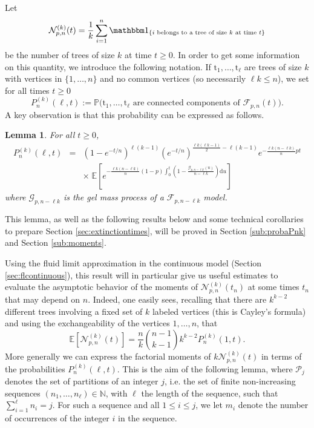 \documentclass[a4, 11pt]{article}
\numberwithin{equation}{section}
\theoremstyle{plain}
\newtheorem{lemma}[theorem]{Lemma}
\theoremstyle{definition}
\theoremstyle{remark}
\begin{document}
Let 
$$\mathcal N_{p,n}^{(k)}(t)=\frac{1}{k}\sum_{i=1}^n \mathbbm 1_{\{i  \text{ belongs to a tree of size }k \text{ at time }t\}}$$ be the number of trees of size $k$ at time $t \geq 0$. In order to get some information on this quantity, 
we introduce the following notation. If $\mathrm t_1,\ldots,\mathrm t_\ell$ are trees of size $k$ with vertices in $\{1,\ldots,n\}$ and no common vertices (so necessarily $\ell k \leq n$), we set for all times $t\geq 0$
$$
P_n^{(k)}(\ell,t):=\mathbb P \big(\mathrm t_1,\ldots,\mathrm t_{\ell} \text{ are connected components of } \mathcal{F}_{p,n}(t)\big).
$$
A key observation is that this probability can be expressed as follows.

\begin{lemma}
\label{lem:cvPnk}
For all $t\geq 0$,
\begin{eqnarray*}
P_n^{(k)}(\ell,t) &=& \left(1-e^{-t/n}\right)^{\ell (k-1)} \left(e^{-t/n} \right)^{\frac{\ell k(\ell k-1)}{2}-\ell(k-1)}e^{-\frac{\ell k(n-\ell k)}{n}pt} \\
&& \times \; \mathbb E\left[e^{-\frac{\ell k(n-\ell k)}{n} (1-p)\int_0^t \left(1-\frac{\mathcal G_{p,n-\ell k}(u)}{n- \ell k} \right) \mathrm du} \right]
\end{eqnarray*}
where $\mathcal G_{p,n-\ell k}$ is the gel mass process of a $\mathcal F_{p,n-\ell k}$ model.
\end{lemma}

This lemma, as well as the following results below and some technical corollaries to prepare Section \ref{sec:extinctiontimes}, will be proved in Section \ref{sub:probaPnk} and Section \ref{sub:moments}.

Using the fluid limit approximation in the continuous model (Section \ref{sec:flcontinuous}), this result will in particular give us useful estimates to evaluate the asymptotic behavior of the moments of $\mathcal N_{p,n}^{(k)}(t_n)$ at some times $t_n$ that may depend on $n$. Indeed, one easily sees, recalling that there are $k^{k-2}$ different trees involving a fixed set of  $k$ labeled vertices (this is Cayley's formula) and using the exchangeability of the vertices $1,\ldots,n$, that
\begin{equation}
\label{esp:N}
\mathbb E\left[\mathcal N_{p,n}^{(k)}(t)\right]=\frac{n}{k} \binom{n-1}{k-1} k^{k-2} P^{(k)}_n(1,t).
\end{equation}
More generally we can express the factorial moments of $k \mathcal N_{p,n}^{(k)}(t)$ in terms of the probabilities $P^{(k)}_n\left(\ell,t\right)$. This is the aim of the following lemma, where $\mathcal P_j$ denotes the set of partitions of an integer $j$, i.e. the set of finite non-increasing sequences $(n_1,\ldots,n_\ell) \in \mathbb N$, with $\ell$ the length of the sequence, such that $\sum_{i=1}^\ell n_i=j$. For such a sequence and all $1\leq i \leq j$, we let $m_i$ denote the number of occurrences of the integer $i$ in the sequence.
\end{document}
